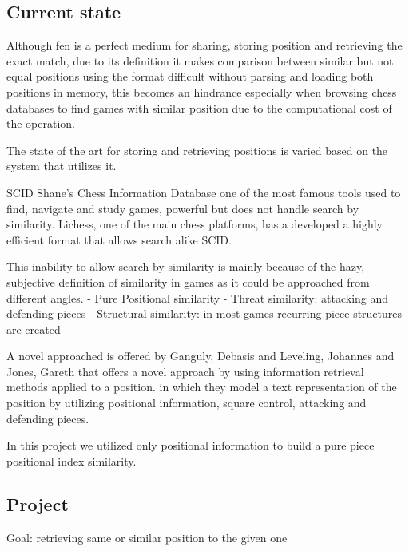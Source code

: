 
\subsection{Current state}
Although fen is a perfect medium for sharing, storing position and retrieving the exact match, 
due to its definition it makes comparison between similar but not equal positions using the format
difficult without parsing and loading both positions in memory, 
this becomes an hindrance especially when browsing chess databases to find games with similar position due to the computational cost of the operation.

The state of the art for storing and retrieving positions is varied based on the system that utilizes it.

SCID Shane's Chess Information Database one of the most famous tools used to find, navigate and study games, powerful but does not handle search by similarity.
Lichess, one of the main chess platforms, has a developed a highly efficient format \cite{retrieval:lichess:format} that allows search alike SCID.

This inability to allow search by similarity is mainly because of the hazy, subjective definition of similarity in games as it could be approached from different angles.
- Pure Positional similarity
- Threat similarity: attacking and defending pieces
- Structural similarity: in most games recurring piece structures are created

A novel approached is offered by Ganguly, Debasis and Leveling, Johannes and Jones, Gareth 
\cite{retrieval:soa:ids} that offers a novel approach by using information retrieval methods applied to a position.
in which they model a text representation of the position by utilizing positional information, square control, attacking and defending pieces.

In this project we utilized only positional information to build a pure piece positional index similarity.

\subsection{Project}
Goal: retrieving same or similar position to the given one

